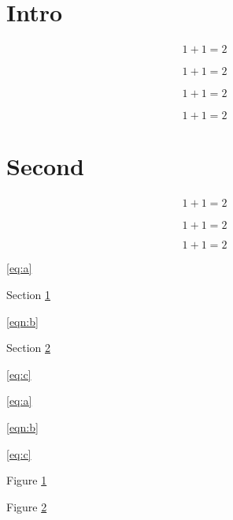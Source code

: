 


\section{Intro} \label{sec:intro}

\begin{align*}
1+1 = 2
\end{align*}

\begin{equation*}
1+1 = 2
\end{equation*}

\begin{align}
1+1 = 2
\end{align}

\begin{equation}
1+1 = 2
\end{equation}

\section{Second} \label{sec:second}

\begin{align} \label{eq:a}
1+1 = 2
\end{align}

\begin{figure}
\label{fig:a}
\end{figure}

\begin{equation} \label{eqn:b}
1+1 = 2
\end{equation}

\begin{equation}
\label{eq:c}
1+1 = 2
\end{equation}

\begin{figure}
\label{fig:b}
\end{figure}

\ref{eq:a}

Section \ref{sec:intro}

\ref{eqn:b}

Section \ref{sec:second}

\ref{eq:c}

\eqref{eq:a}

\eqref{eqn:b}

\eqref{eq:c}

Figure \ref{fig:a}

Figure \ref{fig:b}

